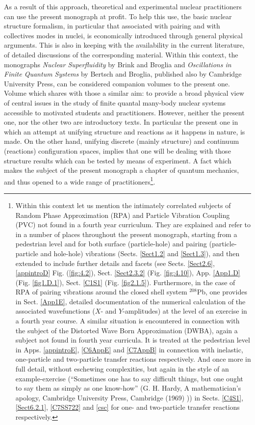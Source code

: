 As a result of this approach, theoretical and experimental nuclear practitioners can use the present monograph at profit. To help this use, the basic nuclear structure formalism, in particular that associated with pairing and with collectives modes in nuclei, is economically introduced through general physical arguments. This is also in keeping with the availability in the current literature, of detailed discussions of the corresponding material. Within this context, the monographs \emph{Nuclear Superfluidity} by Brink and Broglia and \emph{Oscillations in Finite Quantum Systems}  by Bertsch and Broglia, published also by Cambridge University Press, can be considered companion volumes to the present one. Volume which shares with those a similar aim: to provide a broad physical view of central issues in the study of finite quantal many-body nuclear systems accessible to motivated students and practitioners. However, neither the present one, nor the other two are introductory texts. In particular the present one in which an attempt at unifying structure and reactions as it happens in nature, is made. On the other hand, unifying discrete (mainly structure) and continuum (reactions) configuration spaces, implies that one will be dealing with those structure results which can be tested by means of experiment. A fact which makes the subject of the present monograph a chapter of quantum mechanics, and thus opened to a wide range of practitioners\footnote{Within this context let us mention the intimately correlated subjects of Random Phase Approximation (RPA) and Particle Vibration Coupling (PVC) not found in a fourth year curriculum. They are explained and refer to in a number of places throughout the present monograph, starting from a pedestrian level and for both surface (particle-hole) and pairing (particle-particle and hole-hole) vibrations (Sects. \ref{Sect1.2} and \ref{Sect1.3}), and then extended to include further details and facets (see Sects. \ref{Sect2.6}, \ref{appintroD} Fig. (\ref{fig:4.2}), Sect. \ref{Sect2.3.2} (Fig. \ref{fig:4.10}), App. \ref{App1.D} (Fig. \ref{fig1.D.1}), Sect. \ref{C1S1} (Fig. \ref{fig2.1.5}). Furthermore, in the case of RPA of pairing vibrations around the closed shell system $^{208}$Pb, one provides in Sect. \ref{App1E}, detailed documentation of the numerical calculation of the associated wavefunctions ($X$- and $Y$-amplitudes) at the level of an exercise in a fourth year course. A similar situation is encountered in connection with the subject of the Distorted Wave Born Approximation (DWBA), again a subject not found in fourth year curricula. It is treated at the pedestrian level in Apps. \ref{appintroE}, \ref{C6AppE} and \ref{C7AppB} in connection with inelastic, one-particle and two-particle transfer reactions respectively. And once more in full detail, without eschewing complexities, but again in the style of an example-exercise (``Sometimes one has to say difficult things, but one ought to say them as simply as one know-how'' (G. H. Hardy, A mathematician's apology, Cambridge University Press, Cambridge (1969) )) in Sects. \ref{C4S1}, \ref{Sect6.2.1}, \ref{C7SS722} and \ref{csc} for one- and two-particle transfer reactions respectively.}.

